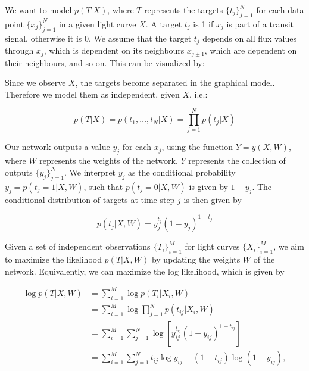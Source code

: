 
We want to model $p(T|X)$, where $T$ represents the targets $\{t_j\}_{j=1}^N$ for each data point $\{x_j\}_{j=1}^N$ in a given light curve $X$. A target $t_j$ is 1 if $x_j$ is part of a transit signal, otherwise it is 0. We assume that the target $t_j$ depends on all flux values through $x_j$, which is dependent on its neighbours $x_{j\pm1}$, which are dependent on their neighbours, and so on. This can be visualized by:

\begin{figure}[H]
\centering
\end{figure}

\noindent Since we observe $X$, the targets become separated in the graphical model. Therefore we model them as independent, given $X$, i.e.:

\begin{equation}
    p(T|X) = p(t_1,\dots,t_N|X) = \prod_{j=1}^N p(t_j|X)
\end{equation}

\noindent Our network outputs a value $y_j$ for each $x_j$, using the function $Y = y(X, W)$, where $W$ represents the weights of the network. $Y$ represents the collection of outputs $\{y_j\}_{j=1}^N$. We interpret $y_j$ as the conditional probability $y_j = p(t_j=1|X,W)$, such that $p(t_j=0|X,W)$ is given by $1-y_j$. The conditional distribution of targets at time step $j$ is then given by

\begin{equation}
    p(t_j|X,W) = y_j^{t_j} (1-y_j)^{1-t_j}
\end{equation}

\noindent Given a set of independent observations $\{T_i\}_{i=1}^M$ for light curves $\{X_i\}_{i=1}^M$, we aim to maximize the likelihood $p(T|X,W)$ by updating the weights $W$ of the network. Equivalently, we can maximize the log likelihood, which is given by

\begin{align}
    \log p(T|X,W) &= \sum_{i=1}^M \log  p(T_i|X_i,W) \\
    &= \sum_{i=1}^M \log \prod_{j=1}^N p(t_{ij}|X_i,W) \\
    &= \sum_{i=1}^M \sum_{j=1}^N \log [ y_{ij}^{t_{ij}} (1-y_{ij})^{1-t_{ij}} ] \\
    &= \sum_{i=1}^M \sum_{j=1}^N t_{ij} \log y_{ij} + (1-t_{ij}) \log(1-y_{ij}),
\end{align}

